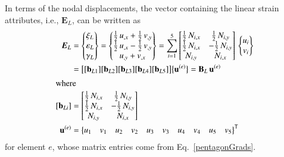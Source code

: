 In terms of the nodal displacements, the vector containing the linear strain attributes, i.e., $\boldsymbol{E}_L$, can be written as
\begin{subequations}
\begin{align}
    \boldsymbol{E}_L & = \begin{Bmatrix}
    \xi_{L} \\
    \varepsilon_{L} \\
    \gamma_{L} \end{Bmatrix} = 
    \begin{Bmatrix}
    \tfrac{1}{2} \, u_{,x} + \tfrac{1}{2} \, v_{,y} \\
    \tfrac{1}{2} \, u_{,x} - \tfrac{1}{2} \, v_{,y} \\
    u_{,y} + v_{,x} \end{Bmatrix} = 
    \sum_{i=1}^5 \begin{bmatrix}
    \tfrac{1}{2} \, N_{i,x} & \tfrac{1}{2} \, N_{i,y}  \\
    \tfrac{1}{2} \, N_{i,x} & -\tfrac{1}{2} \, N_{i,y} \\ 
    N_{i,y} & N_{i,x}  \end{bmatrix} \, 
    \begin{Bmatrix}
    u_{i} \\
    v_{i} 
    \end{Bmatrix} \notag \\
    & = \bigl[ [\mathbf{b}_{L1}] [\mathbf{b}_{L2}] [\mathbf{b}_{L3}] 
    [\mathbf{b}_{L4}] [\mathbf{b}_{L5}] \bigr]
    \bigl\{ \mathbf{u}^{(e)} \bigr\}  
    = \mathbf{B}_L \, \mathbf{u}^{(e)}  \\
    \intertext{where}
    [\mathbf{b}_{Li}] & = \begin{bmatrix}
    \tfrac{1}{2} \, N_{i,x}  &  \tfrac{1}{2} \, N_{i,y} \\
    \tfrac{1}{2} \, N_{i,x}  & - \tfrac{1}{2} \, N_{i,y} \\
    N_{i,y} & N_{i,x} 
    \end{bmatrix} \\
    \mathbf{u}^{(e)} & = \bigl\{ \begin{matrix}
    u_1 & v_1 & u_2 & v_2 & u_3 & v_3 & u_4 & v_4 & u_5 & v_5 
    \end{matrix} \bigr\}^{\mathsf{T}}
\end{align}
\end{subequations}
for element $e$, whose matrix entries come from Eq.~\ref{pentagonGrads}.

